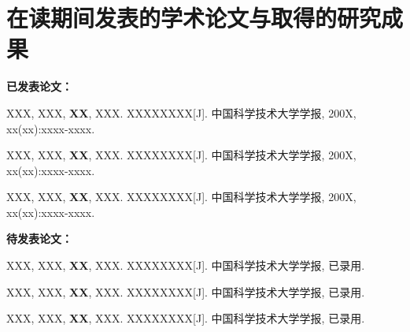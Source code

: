 ﻿
\chapter{在读期间发表的学术论文与取得的研究成果}

\textbf{已发表论文：}

\begin{publications}

\item
XXX, XXX, \textbf{XX}, XXX. XXXXXXXX[J]. 中国科学技术大学学报, 200X, xx(xx):xxxx-xxxx.

\item
XXX, XXX, \textbf{XX}, XXX. XXXXXXXX[J]. 中国科学技术大学学报, 200X, xx(xx):xxxx-xxxx.

\item
XXX, XXX, \textbf{XX}, XXX. XXXXXXXX[J]. 中国科学技术大学学报, 200X, xx(xx):xxxx-xxxx.

\end{publications}

\vskip 1cm

\textbf{待发表论文：}

\begin{publications}

\item
XXX, XXX, \textbf{XX}, XXX. XXXXXXXX[J]. 中国科学技术大学学报, 已录用.

\item
XXX, XXX, \textbf{XX}, XXX. XXXXXXXX[J]. 中国科学技术大学学报, 已录用.

\item
XXX, XXX, \textbf{XX}, XXX. XXXXXXXX[J]. 中国科学技术大学学报, 已录用.

\end{publications}